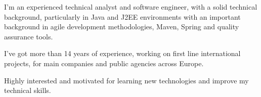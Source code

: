 \par{

I'm an experienced technical analyst and software engineer, with a solid technical background,
particularly in Java and J2EE environments with an important background in agile development
methodologies, Maven, Spring and quality assurance tools.

I've got more than 14 years of experience, working on first line international projects, for main companies and public agencies across Europe. 

Highly interested and motivated for learning new technologies and improve my technical skills.

}